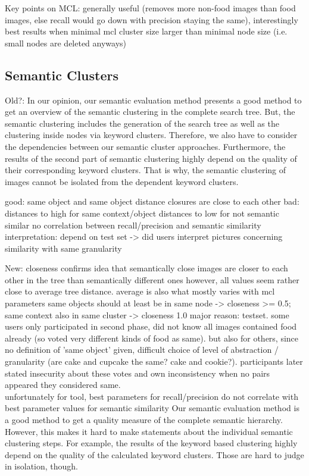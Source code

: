 \bigskip
Key points on MCL: generally useful (removes more non-food images than food images, else recall would go down with precision staying the same), interestingly best results when minimal mcl cluster size larger than minimal node size (i.e. small nodes are deleted anyways)

\subsection{Semantic Clusters}
Old?:
In our opinion, our semantic evaluation method presents a good method to get an overview of the semantic clustering in the complete search tree. But, the semantic clustering includes the generation of the search tree as well as the clustering inside nodes via keyword clusters. Therefore, we also have to consider the dependencies between our semantic cluster approaches. Furthermore, the results of the second part of semantic clustering highly depend on the quality of their corresponding keyword clusters. That is why, the semantic clustering of images cannot be isolated from the dependent keyword clusters.

good: same object and same object distance closures are close to each other
bad: distances to high for same context/object
	 distances to low for not semantic similar
	 no correlation between recall/precision and semantic similarity
interpretation: depend on test set -> did users interpret pictures concerning similarity with same granularity
	
\bigskip
New:
closeness confirms idea that semantically close images are closer to each other in the tree than semantically different ones
however, all values seem rather close to average tree distance. average is also what mostly varies with mcl parameters
same objects should at least be in same node -> closeness >= 0.5; same context also in same cluster -> closeness 1.0
major reason: testset. some  users only participated in second phase, did not know all images contained food already (so voted very different kinds of food as same). but also for others, since no definition of 'same object' given, difficult choice of level of abstraction / granularity (are cake and cupcake the same? cake and cookie?). participants later stated insecurity about these votes and own inconsistency when no pairs appeared they considered same.\\
unfortunately for tool, best parameters for recall/precision do not correlate with best parameter values for semantic similarity
\bigskip
Our semantic evaluation method is a good method to get a quality measure of the complete semantic hierarchy. However, this makes it hard to make statements about the individual semantic clustering steps. For example, the results of the keyword based clustering highly depend on the quality of the calculated keyword clusters. Those are hard to judge in isolation, though.\\	

